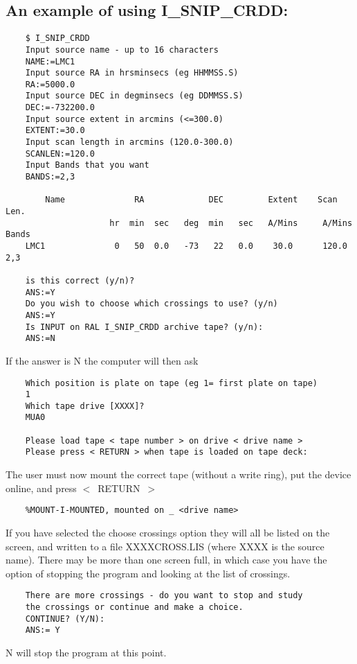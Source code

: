 \subsection {An example of using I\_SNIP\_CRDD:}
\begin{verbatim}
    $ I_SNIP_CRDD
    Input source name - up to 16 characters       
    NAME:=LMC1
    Input source RA in hrsminsecs (eg HHMMSS.S)
    RA:=5000.0
    Input source DEC in degminsecs (eg DDMMSS.S)
    DEC:=-732200.0
    Input source extent in arcmins (<=300.0)
    EXTENT:=30.0
    Input scan length in arcmins (120.0-300.0)
    SCANLEN:=120.0
    Input Bands that you want 
    BANDS:=2,3

        Name              RA             DEC         Extent    Scan Len.       
                     hr  min  sec   deg  min   sec   A/Mins     A/Mins    Bands
    LMC1              0   50  0.0   -73   22   0.0    30.0      120.0      2,3

    is this correct (y/n)?
    ANS:=Y
    Do you wish to choose which crossings to use? (y/n)
    ANS:=Y
    Is INPUT on RAL I_SNIP_CRDD archive tape? (y/n):
    ANS:=N
\end{verbatim}

\vspace {3mm}
If the answer is N the computer will then ask

\begin{verbatim}
    Which position is plate on tape (eg 1= first plate on tape) 
    1
    Which tape drive [XXXX]? 
    MUA0

    Please load tape < tape number > on drive < drive name >
    Please press < RETURN > when tape is loaded on tape deck:
\end{verbatim}

The user must now mount the correct tape (without a write ring), put
the device online, and press $<$~RETURN~$>$

\begin{verbatim}
    %MOUNT-I-MOUNTED, mounted on _ <drive name>
\end{verbatim}
If you have selected the choose crossings option they will all be listed 
on the screen, and written to a file XXXXCROSS.LIS (where XXXX is the source
name).  There may be more than one screen full, in which case you have 
the option of stopping the program and looking at the list of crossings.

\begin{verbatim}
    There are more crossings - do you want to stop and study 
    the crossings or continue and make a choice.
    CONTINUE? (Y/N):
    ANS:= Y
\end{verbatim}
N will stop the program at this point.
  
